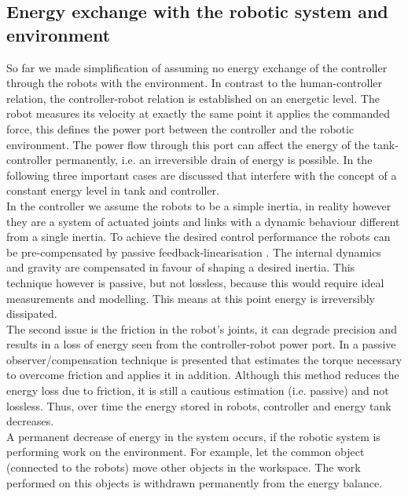 \documentclass[a4paper,twoside, openright,12pt]{report}
\begin{document}
\subsection{Energy exchange with the robotic system and environment}\label{SS:EnergyExchangeEnvironment}
So far we made simplification of assuming no energy exchange of the controller through the robots with the environment. In contrast to the human-controller relation, the controller-robot relation is established on an energetic level. The robot measures its velocity at exactly the same point it applies the commanded force, this defines the power port between the controller and the robotic environment. The power flow through this port can affect the energy of the tank-controller permanently, i.e. an irreversible drain of  energy is possible. In the following three important cases are discussed that interfere with the concept of a constant energy level in tank and controller.\\ 
In the controller we assume the robots to be a simple inertia, in reality however they are a system of actuated joints and links with a dynamic behaviour different from a  single inertia. To achieve the desired control performance the robots can be pre-compensated by  passive feedback-linearisation \cite{Ott_04}. The internal dynamics and gravity are compensated in favour of shaping a desired inertia. This technique however is passive, but not lossless, because this would require ideal measurements and modelling. This means at this point energy is irreversibly dissipated. \\
The second issue is the friction in the robot's joints, it can degrade precision and results in a loss of energy seen from the controller-robot power port. In \cite{Tien_08} a passive observer/compensation technique is presented that estimates the torque necessary to overcome friction and applies it in addition. Although this method reduces the energy loss due to friction, it is still a cautious estimation (i.e. passive) and not lossless. Thus, over time the energy stored in robots, controller and energy tank decreases. \\
A permanent decrease of energy in the system occurs, if the robotic system is performing work on the environment. For example, let the common object (connected to the robots) move other objects in the workspace. The work performed on this objects is withdrawn permanently from the energy balance.\\
\end{document}

